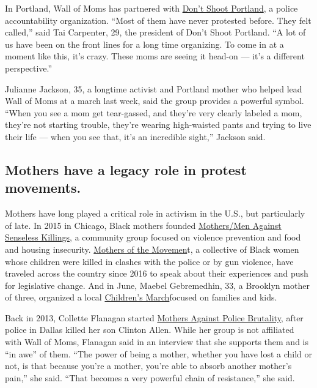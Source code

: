 In Portland, Wall of Moms has partnered with
\href{https://www.dontshootpdx.org/}{Don't Shoot Portland}, a police
accountability organization. ``Most of them have never protested before.
They felt called,'' said Tai Carpenter, 29, the president of Don't Shoot
Portland. ``A lot of us have been on the front lines for a long time
organizing. To come in at a moment like this, it's crazy. These moms are
seeing it head-on --- it's a different perspective.''

Julianne Jackson, 35, a longtime activist and Portland mother who helped
lead Wall of Moms at a march last week, said the group provides a
powerful symbol. ``When you see a mom get tear-gassed, and they're very
clearly labeled a mom, they're not starting trouble, they're wearing
high-waisted pants and trying to live their life --- when you see that,
it's an incredible sight,'' Jackson said.

\hypertarget{mothers-have-a-legacy-role-in-protest-movements}{%
\subsection{Mothers have a legacy role in protest
movements.}\label{mothers-have-a-legacy-role-in-protest-movements}}

Mothers have long played a critical role in activism in the U.S., but
particularly of late. In 2015 in Chicago, Black mothers founded
\href{https://www.ontheblock.org/about}{Mothers/Men Against Senseless
Killings,} a community group focused on violence prevention and food and
housing insecurity.
\href{https://www.theguardian.com/world/2016/nov/22/mothers-of-the-movement-trayvon-martin-sandra-bland-eric-garner-amadou-diallo-sean-bell}{Mothers
of the Movemen}t, a collective of Black women whose children were killed
in clashes with the police or by gun violence, have traveled across the
country since 2016 to speak about their experiences and push for
legislative change. And in June, Maebel Gebremedhin, 33, a Brooklyn
mother of three, organized a local
\href{https://www.nytimes3xbfgragh.onion/2020/06/15/parenting/childrens-march-protest-brooklyn.html}{Children's
March}focused on families and kids.

Back in 2013, Collette Flanagan started
\href{https://mothersagainstpolicebrutality.org/about/}{Mothers Against
Police Brutality}, after police in Dallas killed her son Clinton Allen.
While her group is not affiliated with Wall of Moms, Flanagan said in an
interview that she supports them and is ``in awe'' of them. ``The power
of being a mother, whether you have lost a child or not, is that because
you're a mother, you're able to absorb another mother's pain,'' she
said. ``That becomes a very powerful chain of resistance,'' she said.

